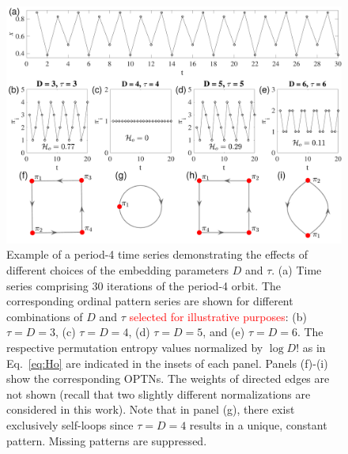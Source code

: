 \documentclass[aip,cha,reprint,nofootinbib]{revtex4-1}
\begin{document}
\begin{figure}
	\centering 
	\includegraphics[width=2\columnwidth]{period4_logisticExample.pdf}
\caption{\small{Example of a period-4 time series demonstrating the effects of different choices of the embedding parameters $D$ and $\tau$. (a) Time series comprising 30 iterations of the period-4 orbit. The corresponding ordinal pattern series are shown for different combinations of $D$ and $\tau$ \textcolor{red}{selected for illustrative purposes}: (b) $\tau = D = 3$, (c) $\tau = D = 4$, (d) $ \tau = D = 5$, and (e) $\tau = D = 6$. The respective permutation entropy values normalized by $\log D!$ as in Eq.~\eqref{eq:Ho} are indicated in the insets of each panel. Panels (f)-(i) show the corresponding OPTNs. The weights of directed edges are not shown (recall that two slightly different normalizations are considered in this work). Note that in panel (g), there exist exclusively self-loops since $\tau = D = 4$ results in a unique, constant pattern. Missing patterns are suppressed.}
\label{fig:embed}}
\end{figure}
\end{document}
